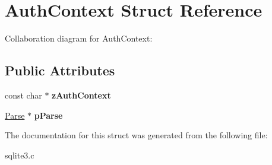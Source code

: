 \hypertarget{structAuthContext}{}\section{Auth\+Context Struct Reference}
\label{structAuthContext}


Collaboration diagram for Auth\+Context\+:
\subsection*{Public Attributes}
\begin{DoxyCompactItemize}
\item 
const char $\ast$ {\bfseries z\+Auth\+Context}\hypertarget{structAuthContext_a1b095b152b72326476ac3f7edcaee78a}{}\label{structAuthContext_a1b095b152b72326476ac3f7edcaee78a}

\item 
\hyperlink{structParse}{Parse} $\ast$ {\bfseries p\+Parse}\hypertarget{structAuthContext_a8df2931d8f4facf59073c92315b00bfa}{}\label{structAuthContext_a8df2931d8f4facf59073c92315b00bfa}

\end{DoxyCompactItemize}


The documentation for this struct was generated from the following file\+:\begin{DoxyCompactItemize}
\item 
sqlite3.\+c\end{DoxyCompactItemize}
